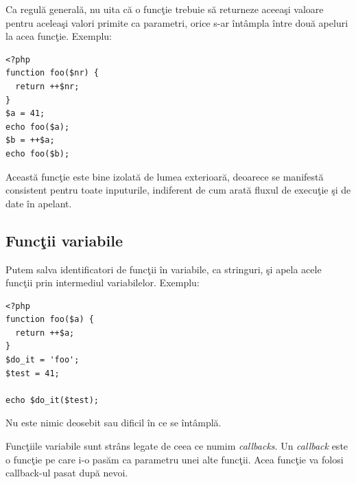 Ca regulă generală, nu uita că o funcţie trebuie să returneze aceeaşi valoare
pentru aceleaşi valori primite ca parametri, orice s-ar întâmpla între două
apeluri la acea funcţie. Exemplu:
\begin{lstlisting}
<?php
function foo($nr) {
  return ++$nr;
}
$a = 41;
echo foo($a);
$b = ++$a;
echo foo($b);
\end{lstlisting}
Această funcţie este bine izolată de lumea exterioară, deoarece se manifestă
consistent pentru toate inputurile, indiferent de cum arată fluxul de execuţie
şi de date în apelant.



\subsection{Funcţii variabile}
Putem salva identificatori de funcţii în variabile, ca stringuri, şi apela 
acele funcţii prin intermediul variabilelor. Exemplu:
\begin{lstlisting}
<?php
function foo($a) {
  return ++$a;
}
$do_it = 'foo';
$test = 41;

echo $do_it($test);
\end{lstlisting}
Nu este nimic deosebit sau dificil în ce se întâmplă.


Funcţiile variabile sunt strâns legate de ceea ce numim \textsl{callbacks}.
Un \textit{callback} este o funcţie pe care i-o pasăm ca parametru
unei alte funcţii. Acea funcţie va folosi callback-ul pasat după nevoi.


